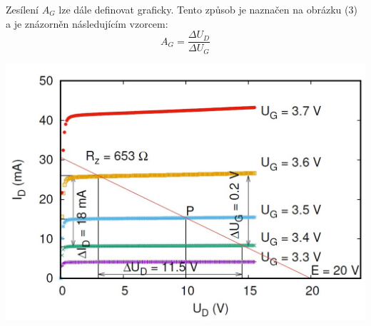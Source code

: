 \documentclass[a4paper,11pt]{article}
\begin{document}
\begin{minipage}[t]{0.5\textwidth}
                \par Zesílení $A_G$ lze dále definovat graficky. Tento způsob je naznačen na obrázku (3) a je znázorněn následujícím vzorcem: 
                \begin{equation}
                    A_G = \frac{\Delta U_{D}}{\Delta U_{G}}
                \end{equation}
                \par \centering
                \includegraphics[scale=0.29]{zas2}
                \captionsetup{justification=centering, font=footnotesize}
                \label{fig:zas2}
                \raggedright
                \vspace{10pt}
    \end{minipage}
    \hspace{10pt}
\end{document}
